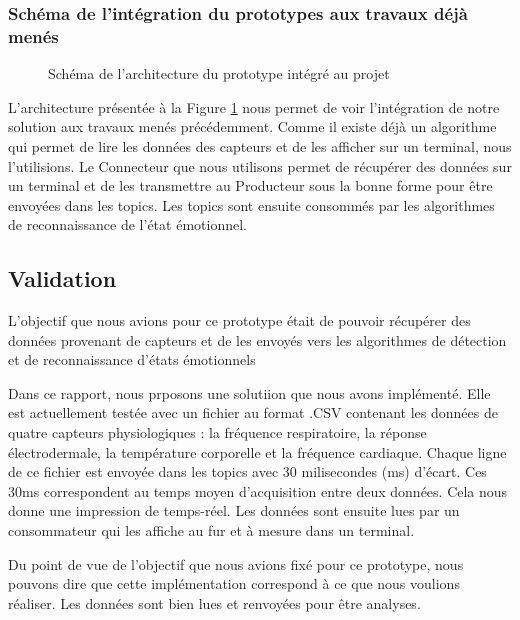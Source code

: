 \documentclass{article}
\begin{document}
		\subsubsection{Schéma de l'intégration du prototypes aux travaux déjà menés}\label{sec:schematravaux}
			\begin{figure}
				\centering
				\vspace*{-1cm}
				\caption{Schéma de l'architecture du prototype intégré au projet}
				\label{fig:archiglobale}
			\end{figure}
			L'architecture présentée à la Figure \ref{fig:archiglobale} nous permet de voir l'intégration de notre solution aux travaux menés précédemment.
			Comme il existe déjà un algorithme qui permet de lire les données des capteurs et de les afficher sur un terminal, nous l'utilisions.
			Le Connecteur que nous utilisons permet de récupérer des données sur un terminal et de les transmettre au Producteur sous la bonne forme pour être envoyées dans les topics.
			Les topics sont ensuite consommés par les algorithmes de reconnaissance de l'état émotionnel.
	\subsection{Validation}\label{sec:validation}
		L'objectif que nous avions pour ce prototype était de pouvoir récupérer des données provenant de capteurs et de les envoyés vers les algorithmes de détection et de reconnaissance d'états émotionnels\par
		Dans ce rapport, nous prposons une solutiion que nous avons implémenté.
		Elle est actuellement testée avec un fichier au format .CSV contenant les données de quatre capteurs physiologiques : la fréquence respiratoire, la réponse électrodermale, la température corporelle et la fréquence cardiaque.
		Chaque ligne de ce fichier est envoyée dans les topics avec 30 milisecondes (ms) d'écart.
		Ces 30ms correspondent au temps moyen d'acquisition entre deux données.
		Cela nous donne une impression de temps-réel.
		Les données sont ensuite lues par un consommateur qui les affiche au fur et à mesure dans un terminal.\par
		Du point de vue de l'objectif que nous avions fixé pour ce prototype, nous pouvons dire que cette implémentation correspond à ce que nous voulions réaliser.
		Les données sont bien lues et renvoyées pour être analyses.
			
\end{document}

